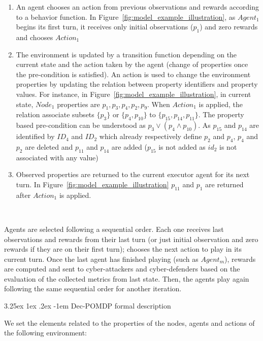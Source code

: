 \documentclass[conference]{IEEEtran}
\makeatletter
\renewcommand\subparagraph{\@startsection{subparagraph}{6}{\parindent}%
  {3.25ex \@plus1ex \@minus .2ex}%
  {-1em}%
  {\normalfont\normalsize\bfseries}}
\makeatother
\begin{document}
\begin{enumerate}     
    \item An agent chooses an action from previous observations and rewards according to a behavior function. In Figure~\ref{fig:model_example_illustration}, as $Agent_1$ begins its first turn, it receives only initial observations ($p_{1}$) and zero rewards and chooses $Action_1$
    
    \item The environment is updated by a transition function depending on the current state and the action taken by the agent (change of properties once the pre-condition is satisfied). An action is used to change the environment properties by updating the relation between property identifiers and property values.
    For instance, in Figure~\ref{fig:model_example_illustration}, in current state, $Node_1$ properties are $p_1,p_3,p_4,p_2,p_9$. When $Action_1$ is applied, the relation associate subsets $\{p_3\}$ or $\{p_4, \allowbreak p_{10}\}$ to $\{p_{15}, \allowbreak p_{14}, \allowbreak p_{11}\}$. The property based pre-condition can be understood as $p_3 \lor (p_4 \land p_{10})$. As $p_{15}$ and $p_{14}$ are identified by $ID_4$ and $ID_2$ which already respectively define $p_{2}$ and $p_{4}$, $p_{4}$ and $p_{2}$ are deleted and $p_{11}$ and $p_{14}$ are added ($p_{15}$ is not added as $id_2$ is not associated with any value)
    
    \item Observed properties are returned to the current executor agent for its next turn. In Figure~\ref{fig:model_example_illustration} $p_{11}$ and $p_1$ are returned after $Action_1$ is applied.

\end{enumerate}

\

Agents are selected following a sequential order. Each one receives last observations and rewards from their last turn (or just initial observation and zero rewards if they are on their first turn); chooses the next action to play in its current turn. Once the last agent has finished playing (such as $Agent_m$), rewards are computed and sent to cyber-attackers and cyber-defenders based on the evaluation of the collected metrics from last state. Then, the agents play again following the same sequential order for another iteration.


\subparagraph{Dec-POMDP formal description}

We set the elements related to the properties of the nodes, agents and actions of the following environment:
\end{document}
